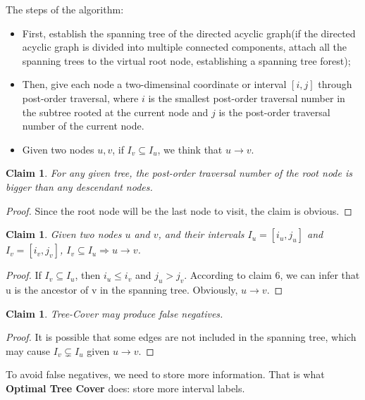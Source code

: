 \documentclass[11pt]{article}
\newtheorem{claim}[theorem]{Claim}
\begin{document}
The steps of the algorithm:
\begin{itemize}
	\item First, establish the spanning tree of the directed acyclic graph(if the directed acyclic graph is divided into multiple connected components, attach all the spanning trees to the virtual root node, establishing a spanning tree forest);
	\item Then, give each node a two-dimensinal coordinate or interval $[i,j]$ through post-order traversal, where $i$ is the smallest post-order traversal number in the subtree rooted at the current node and $j$ is the post-order traversal number of the current node.
	\item Given two nodes $u,v$, if $I_v\subseteq I_u$, we think that $u\rightarrow v$.
\end{itemize}
\begin{claim}
	For any given tree, the post-order traversal number of the root node is bigger than any descendant nodes.
\end{claim}
\begin{proof}
	Since the root node will be the last node to visit, the claim is obvious.
\end{proof}
\begin{claim}
	Given two nodes $u$ and $v$, and their intervals $I_u=[i_u,j_u]$ and $I_v=[i_v,j_v]$, $I_v\subseteq{I_u}\Rightarrow u\rightarrow v$.
\end{claim}
\begin{proof}
	If $I_v\subseteq{I_u}$, then $i_u\leq i_v$ and $j_u>j_v$. According to claim 6, we can infer that u is the ancestor of v in the spanning tree. Obviously, $u\rightarrow v$.
\end{proof}
\begin{claim}
	Tree-Cover may produce false negatives.
\end{claim}
\begin{proof}
	It is possible that some edges are not included in the spanning tree, which may cause $I_v\subsetneq I_u$ given $u\rightarrow v$.
\end{proof}
To avoid false negatives, we need to store more information. That is what \textbf{Optimal Tree Cover}\cite{ref2} does: store more interval labels.
\end{document}

